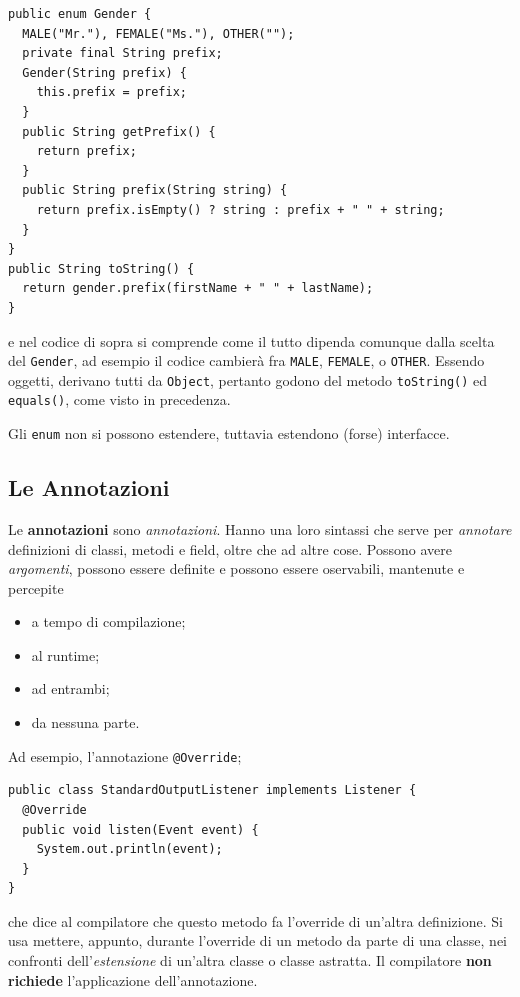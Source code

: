 \documentclass[\fontsizeclass,twocolumn]{\classname}
\theoremstyle{definition}
\theoremstyle{definition}
\begin{document}
\begin{lstlisting}
public enum Gender {
  MALE("Mr."), FEMALE("Ms."), OTHER("");
  private final String prefix;
  Gender(String prefix) {
    this.prefix = prefix;
  }
  public String getPrefix() {
    return prefix;
  }
  public String prefix(String string) {
    return prefix.isEmpty() ? string : prefix + " " + string;
  }
}
public String toString() {
  return gender.prefix(firstName + " " + lastName);
}
\end{lstlisting}

e nel codice di sopra si comprende come il tutto dipenda comunque dalla scelta
del \texttt{Gender}, ad esempio il codice cambierà fra \texttt{MALE},
\texttt{FEMALE}, o \texttt{OTHER}. Essendo oggetti, derivano tutti da
\texttt{Object}, pertanto godono del metodo \texttt{toString()} ed
\texttt{equals()}, come visto in precedenza.

Gli \texttt{enum} non si possono estendere, tuttavia estendono (forse)
interfacce.

\subsection{Le Annotazioni}

Le \textbf{annotazioni} sono \emph{annotazioni}. Hanno una loro sintassi che
serve per \emph{annotare} definizioni di classi, metodi e field, oltre che ad
altre cose. Possono avere \emph{argomenti}, possono essere definite e possono
essere oservabili, mantenute e percepite
\begin{itemize}
    \item a tempo di compilazione;
    \item al runtime;
    \item ad entrambi;
    \item da nessuna parte.
\end{itemize}

Ad esempio, l'annotazione \texttt{@Override};

\begin{lstlisting}
public class StandardOutputListener implements Listener {
  @Override
  public void listen(Event event) {
    System.out.println(event);
  }
}
\end{lstlisting}

che dice al compilatore che questo metodo fa l'override di un'altra
definizione. Si usa mettere, appunto, durante l'override di un metodo da parte
di una classe, nei confronti dell'\emph{estensione} di un'altra classe o classe
astratta. Il compilatore \textbf{non richiede} l'applicazione dell'annotazione.
\end{document}
